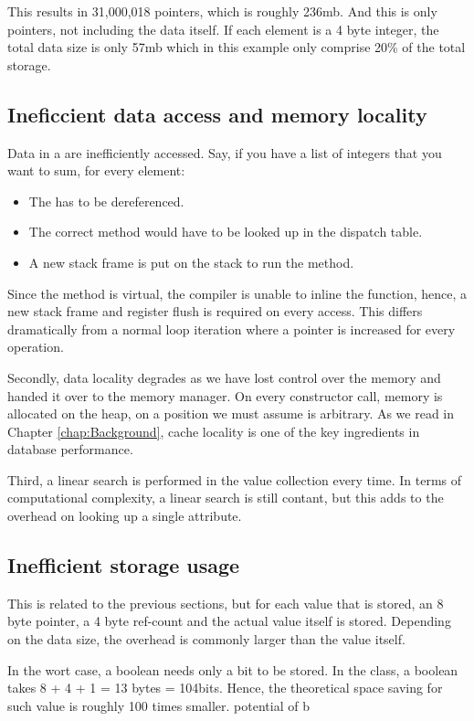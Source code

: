 This results in 31,000,018 pointers, which is roughly 236mb. And this is only pointers, not including the data itself. If each element is a 4 byte integer, the total data size is only 57mb which in this example only comprise 20\% of the total storage.

\subsection{Ineficcient data access and memory locality}
\label{sub:Ineficcient data access and memory locality}
Data in a  are inefficiently accessed. Say, if you have a list of  integers that you want to sum, for every element:
\begin{itemize}
    \item The  has to be dereferenced.
    \item The correct  method would have to be looked up in the dispatch table.
    \item A new stack frame is put on the stack to run the  method.
\end{itemize}
Since the method is virtual, the compiler is unable to inline the function, hence, a new stack frame and register flush is required on every access. This differs dramatically from a normal loop iteration where a pointer is increased for every operation.

Secondly, data locality degrades as we have lost control over the memory and handed it over to the memory manager. On every constructor call, memory is allocated on the heap, on a position we must assume is arbitrary. As we read in Chapter \ref{chap:Background}, cache locality is one of the key ingredients in database performance.

Third, a linear search is performed in the value collection every time. In terms of computational complexity, a linear search is still contant, but this adds to the overhead on looking up a single attribute.

\subsection{Inefficient storage usage}
\label{sub:Inefficient storage usage}
This is related to the previous sections, but for each value that is stored, an 8 byte pointer, a 4 byte ref-count and the actual value itself is stored. Depending on the data size, the overhead is commonly larger than the value itself.

In the wort case, a boolean needs only a bit to be stored. In the  class, a boolean takes 8 + 4 + 1 = 13 bytes = 104bits. Hence, the theoretical space saving for such value is roughly 100 times smaller.
potential of b


